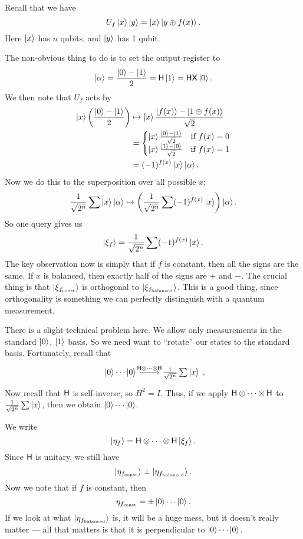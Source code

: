 Recall that we have
\[
  U_f \left\lvert x\right\rangle\left\lvert y\right\rangle = \left\lvert x\right\rangle \left\lvert y \oplus f(x)\right\rangle.
\]
Here $\left\lvert x\right\rangle$ has $n$ qubits, and $\left\lvert y\right\rangle$ has 1 qubit.

The non-obvious thing to do is to set the output register to
\[
  \left\lvert \alpha\right\rangle = \frac{\left\lvert 0\right\rangle - \left\lvert 1\right\rangle}{2} = \mathsf{H}\left\lvert 1\right\rangle = \mathsf{H} \mathsf{X} \left\lvert 0\right\rangle.
\]
We then note that $U_f$ acts by
\begin{align*}
  \left\lvert x\right\rangle\left(\frac{\left\lvert 0\right\rangle - \left\lvert 1\right\rangle}{2}\right) &\mapsto \left\lvert x\right\rangle \frac{\left\lvert f(x)\right\rangle - \left\lvert 1 \oplus f(x)\right\rangle}{\sqrt{2}}\\
  &=
  \begin{cases}
    \left\lvert x\right\rangle\frac{\left\lvert 0\right\rangle - \left\lvert 1\right\rangle}{\sqrt{2}}&\text{if } f(x) = 0\\
    \left\lvert x\right\rangle\frac{\left\lvert 1\right\rangle - \left\lvert 0\right\rangle}{\sqrt{2}}&\text{if } f(x) = 1\\
  \end{cases}\\
  &= (-1)^{f(x)}\left\lvert x\right\rangle\left\lvert \alpha\right\rangle.
\end{align*}
Now we do this to the superposition over all possible $x$:
\[
  \frac{1}{\sqrt{2^n}} \sum \left\lvert x\right\rangle\left\lvert \alpha\right\rangle \mapsto \left(\frac{1}{\sqrt{2^n}} \sum (-1)^{f(x)}\left\lvert x\right\rangle\right) \left\lvert \alpha\right\rangle.
\]
So one query gives us
\[
  \left\lvert \xi_f\right\rangle = \frac{1}{\sqrt{2^n}} \sum (-1)^{f(x)}\left\lvert x\right\rangle.
\]
The key observation now is simply that if $f$ is constant, then all the signs are the same. If $x$ is balanced, then exactly half of the signs are $+$ and $-$. The crucial thing is that $\left\lvert \xi_{f_\text{const}}\right\rangle$ is orthogonal to $\left\lvert \xi_{f_\text{balanced}}\right\rangle$. This is a good thing, since orthogonality is something we can perfectly distinguish with a quantum measurement.

There is a slight technical problem here. We allow only measurements in the standard $\left\lvert 0\right\rangle$, $\left\lvert 1\right\rangle$ basis. So we need want to ``rotate'' our states to the standard basis. Fortunately, recall that
\[
  \begin{tikzcd}
    \bket{0}\cdots\bket{0} \ar[r, "\qH\otimes \cdots\otimes \qH"] &\frac{1}{\sqrt{2^n}}\sum \bket{x}
  \end{tikzcd},
\]
Now recall that $\mathsf{H}$ is self-inverse, so $H^2 = I$. Thus, if we apply $\mathsf{H} \otimes\cdots \otimes \mathsf{H}$ to $\frac{1}{\sqrt{2^n}}\sum \left\lvert x\right\rangle$, then we obtain $\left\lvert 0\right\rangle\cdots\left\lvert 0\right\rangle$.

We write
\[
  \left\lvert \eta_f\right\rangle = \mathsf{H} \otimes \cdots \otimes \mathsf{H} \left\lvert \xi_f\right\rangle.
\]
Since $\mathsf{H}$ is unitary, we still have
\[
  \left\lvert \eta_{f_\mathrm{const}}\right\rangle \perp \left\lvert \eta_{f_\mathrm{balanced}}\right\rangle.
\]
Now we note that if $f$ is constant, then
\[
  \eta_{f_\mathrm{const}} = \pm \left\lvert 0\right\rangle\cdots\left\lvert 0\right\rangle.
\]
If we look at what $\left\lvert \eta_{f_\mathrm{balanced}}\right\rangle$ is, it will be a huge mess, but it doesn't really matter --- all that matters is that it is perpendicular to $\left\lvert 0\right\rangle\cdots\left\lvert 0\right\rangle$.


